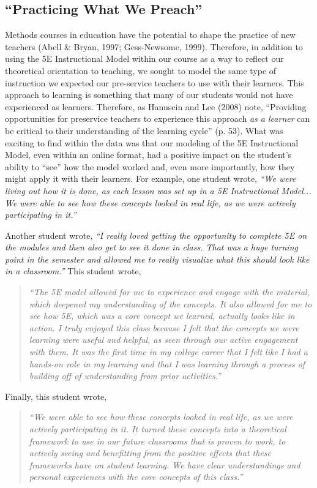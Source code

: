 \documentclass[11.5pt]{sig-alternate} %
\begin{document}
\begin{large}
\subsection*{``Practicing What We Preach''} 
Methods courses in education have the potential to shape the practice of new teachers (Abell \& Bryan, 1997; Gess-Newsome, 1999). Therefore, in addition to using the 5E Instructional Model within our course as a way to reflect our theoretical orientation to teaching, we sought to model the same type of instruction we expected our pre-service teachers to use with their learners. This approach to learning is something that many of our students would not have experienced as learners. Therefore, as Hanuscin and Lee (2008) note, “Providing opportunities for preservice teachers to experience this approach \textit{as a learner} can be critical to their understanding of the learning cycle” (p. 53). What was exciting to find within the data was that our modeling of the 5E Instructional Model, even within an online format, had a positive impact on the student’s ability to “see” how the model worked and, even more importantly, how they might apply it with their learners. For example, one student wrote, \textit{“We were living out how it is done, as each lesson was set up in a 5E Instructional Model... We were able to see how these concepts looked in real life, as we were actively participating in it.''} 
 
Another student wrote, \textit{``I really loved getting the opportunity to complete 5E on the modules and then also get to see it done in class. That was a huge turning point in the semester and allowed me to really visualize what this should look like in a classroom.”}
This student wrote,
\begin{quote} 
    \textit{“The 5E model allowed for me to experience and engage with the material, which deepened my understanding of the concepts. It also allowed for me to see how 5E, which was a core concept we learned, actually looks like in action. I truly enjoyed this class because I felt that the concepts we were learning were useful and helpful, as seen through our active engagement with them. It was the first time in my college career that I felt like I had a hands-on role in my learning and that I was learning through a process of building off of understanding from prior activities.”}
\end{quote}

Finally, this student wrote, 

\begin{quote}
    \textit{“We were able to see how these concepts looked in real life, as we were actively participating in it. It turned these concepts into a theoretical framework to use in our future classrooms that is proven to work, to actively seeing and benefitting from the positive effects that these frameworks have on student learning. We have clear understandings and personal experiences with the core concepts of this class.”}
\end{quote}


\end{large}
\end{document}
